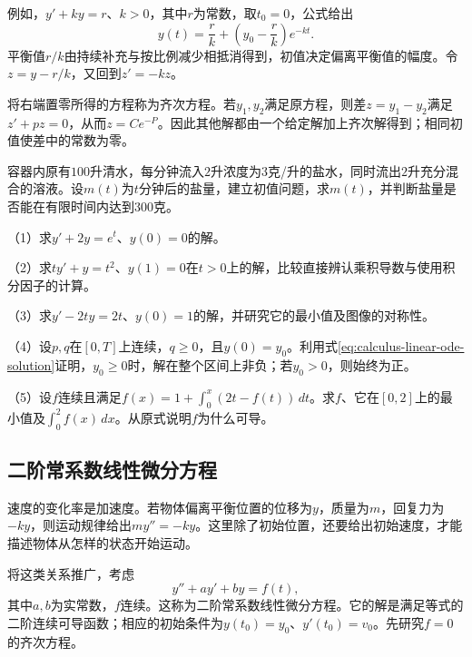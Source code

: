 例如，\(y'+ky=r\)、\(k>0\)，其中\(r\)为常数，取\(t_0=0\)，公式给出
\begin{equation*}
 y(t)=\frac rk+\left(y_0-\frac rk\right)e^{-kt}.
\end{equation*}
平衡值\(r/k\)由持续补充与按比例减少相抵消得到，初值决定偏离平衡值的幅度。令\(z=y-r/k\)，又回到\(z'=-kz\)。

将右端置零所得的方程称为{\heiti{}齐次方程}。若\(y_1,y_2\)满足原方程，则差\(z=y_1-y_2\)满足\(z'+pz=0\)，从而\(z=Ce^{-P}\)。因此其他解都由一个给定解加上齐次解得到；相同初值使差中的常数为零。

\begin{example}
容器内原有\(100\)升清水，每分钟流入\(2\)升浓度为\(3\)克/升的盐水，同时流出\(2\)升充分混合的溶液。设\(m(t)\)为\(t\)分钟后的盐量，建立初值问题，求\(m(t)\)，并判断盐量是否能在有限时间内达到\(300\)克。
\end{example}

\begin{exercise}
\mbox{}\par\nobreak

（1）求\(y'+2y=e^t\)、\(y(0)=0\)的解。

（2）求\(ty'+y=t^2\)、\(y(1)=0\)在\(t>0\)上的解，比较直接辨认乘积导数与使用积分因子的计算。

（3）求\(y'-2ty=2t\)、\(y(0)=1\)的解，并研究它的最小值及图像的对称性。

（4）设\(p,q\)在\([0,T]\)上连续，\(q\ge0\)，且\(y(0)=y_0\)。利用式\eqref{eq:calculus-linear-ode-solution}证明，\(y_0\ge0\)时，解在整个区间上非负；若\(y_0>0\)，则始终为正。

（5）设\(f\)连续且满足\(f(x)=1+\int_0^x(2t-f(t))\,dt\)。求\(f\)、它在\([0,2]\)上的最小值及\(\int_0^2 f(x)\,dx\)。从原式说明\(f\)为什么可导。
\end{exercise}

\begingroup
\subsection{二阶常系数线性微分方程}
\label{subsec:calculus-second-order-ode}
\setlength{\parskip}{4pt}
\setlength{\abovedisplayskip}{10pt}
\setlength{\belowdisplayskip}{10pt}

速度的变化率是加速度。若物体偏离平衡位置的位移为\(y\)，质量为\(m\)，回复力为\(-ky\)，则运动规律给出\(my''=-ky\)。这里除了初始位置，还要给出初始速度，才能描述物体从怎样的状态开始运动。

将这类关系推广，考虑
\begin{equation}\label{eq:calculus-second-order-ode}
 y''+ay'+by=f(t),
\end{equation}
其中\(a,b\)为实常数，\(f\)连续。这称为{\heiti{}二阶常系数线性微分方程}。它的解是满足等式的二阶连续可导函数；相应的初始条件为\(y(t_0)=y_0\)、\(y'(t_0)=v_0\)。先研究\(f=0\)的{\heiti{}齐次方程}。

